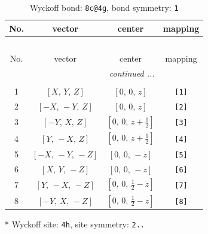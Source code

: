\documentclass[fleqn,8pt]{jsarticle}
\begin{document}
\renewcommand{\arraystretch}{1.2}
\begin{longtable}{cccc}
\caption{Wyckoff bond: {\tt 8c@4g}, bond symmetry: {\tt 1}}
 \\
 \hline \hline
No. & vector & center & mapping \\ \hline \endfirsthead

\multicolumn{3}{l}{\tablename\ \thetable{}} \\
 \hline \hline
No. & vector & center & mapping \\ \hline \endhead

 \hline \hline
\multicolumn{3}{r}{\footnotesize\it continued ...} \\ \endfoot

 \hline \hline
\multicolumn{3}{r}{} \\ \endlastfoot

1 & $\left[ X,\, Y,\, Z \right]$ & $\left[ 0,\, 0,\, z \right]$ & {\tt [1]} \\ \hline
2 & $\left[ - X,\, - Y,\, Z \right]$ & $\left[ 0,\, 0,\, z \right]$ & {\tt [2]} \\ \hline
3 & $\left[ - Y,\, X,\, Z \right]$ & $\left[ 0,\, 0,\, z + \frac{1}{2} \right]$ & {\tt [3]} \\ \hline
4 & $\left[ Y,\, - X,\, Z \right]$ & $\left[ 0,\, 0,\, z + \frac{1}{2} \right]$ & {\tt [4]} \\ \hline
5 & $\left[ - X,\, - Y,\, - Z \right]$ & $\left[ 0,\, 0,\, - z \right]$ & {\tt [5]} \\ \hline
6 & $\left[ X,\, Y,\, - Z \right]$ & $\left[ 0,\, 0,\, - z \right]$ & {\tt [6]} \\ \hline
7 & $\left[ Y,\, - X,\, - Z \right]$ & $\left[ 0,\, 0,\, \frac{1}{2} - z \right]$ & {\tt [7]} \\ \hline
8 & $\left[ - Y,\, X,\, - Z \right]$ & $\left[ 0,\, 0,\, \frac{1}{2} - z \right]$ & {\tt [8]} \\
\end{longtable}
* Wyckoff site: {\tt 4h}, site symmetry: {\tt 2..}
\renewcommand{\arraystretch}{1.2}
\end{document}
